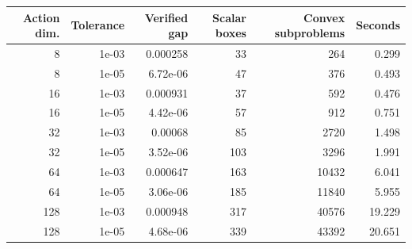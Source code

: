 \begin{tabular}{r r r r r r}
\toprule
Action dim. & Tolerance & Verified gap & Scalar boxes & Convex subproblems & Seconds \\
\midrule
8 & 1e-03 & 0.000258 & 33 & 264 & 0.299 \\
8 & 1e-05 & 6.72e-06 & 47 & 376 & 0.493 \\
16 & 1e-03 & 0.000931 & 37 & 592 & 0.476 \\
16 & 1e-05 & 4.42e-06 & 57 & 912 & 0.751 \\
32 & 1e-03 & 0.00068 & 85 & 2720 & 1.498 \\
32 & 1e-05 & 3.52e-06 & 103 & 3296 & 1.991 \\
64 & 1e-03 & 0.000647 & 163 & 10432 & 6.041 \\
64 & 1e-05 & 3.06e-06 & 185 & 11840 & 5.955 \\
128 & 1e-03 & 0.000948 & 317 & 40576 & 19.229 \\
128 & 1e-05 & 4.68e-06 & 339 & 43392 & 20.651 \\
\bottomrule
\end{tabular}
